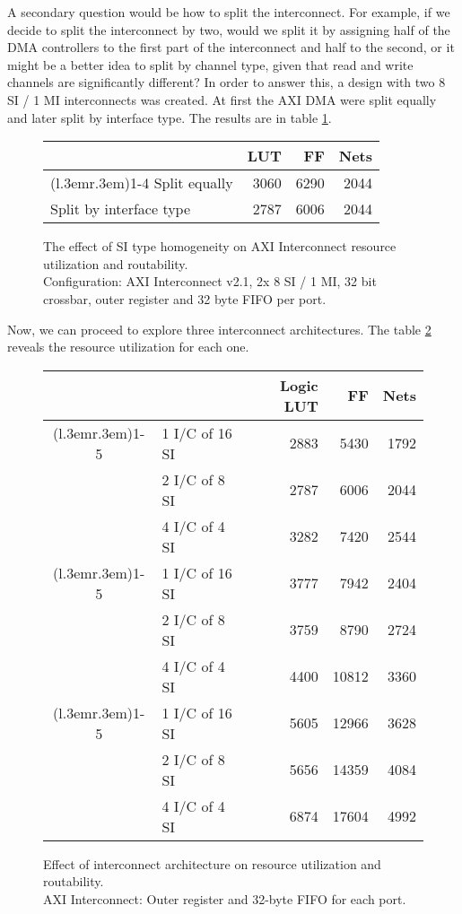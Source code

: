 A secondary question would be how to split the interconnect.
For example, if we decide to split the interconnect by two,
would we split it by assigning half of the DMA controllers to the first
part of the interconnect and half to the second, or it might be a better idea to split by
channel type, given that read and write channels are significantly different?
In order to answer this, a design with two 8 SI / 1 MI interconnects was created.
At first the AXI DMA were split equally and later split by interface type.
The results are in table \ref{tab:int-mixed}.

\begin{figure}[ht!]
\centering
\begin{tabular}{lrrr}
\toprule
			& LUT	& FF	& Nets \\
\cmidrule(l{.3em}r{.3em}){1-4}
Split equally 		& 3060	&6290	&2044 	\\
Split by interface type	& 2787	&6006	& 2044	\\
\bottomrule
\end{tabular}
\caption{The effect of SI type homogeneity on AXI Interconnect resource utilization and routability.\\
	Configuration: AXI Interconnect v2.1, 2x 8 SI / 1 MI, 32 bit crossbar,
	outer register and 32 byte FIFO per port.}
\label{tab:int-mixed}
\end{figure}

Now, we can proceed to explore three interconnect architectures.
The table \ref{tab:int-msi} reveals the resource utilization for each one.

\begin{figure}[ht!]
\centering
\begin{tabular}{cl rrr}
\toprule
&		&Logic LUT & FF	& Nets \\
\cmidrule(l{.3em}r{.3em}){1-5}
\multirow{3}{*}{\rotatebox{90}{32 bit}}
&1 I/C of 16 SI	& 2883	& 5430	& 1792 	\\
&2 I/C of 8 SI	& 2787	& 6006	& 2044	\\
&4 I/C of 4 SI	& 3282	& 7420	& 2544	\\
\cmidrule(l{.3em}r{.3em}){1-5}
\multirow{3}{*}{\rotatebox{90}{64 bit}}
&1 I/C of 16 SI	& 3777	& 7942 	& 2404	\\
&2 I/C of 8 SI	& 3759	& 8790	& 2724	\\
&4 I/C of 4 SI	& 4400	&10812	& 3360	\\
\cmidrule(l{.3em}r{.3em}){1-5}
\multirow{3}{*}{\rotatebox{90}{128 bit}}
&1 I/C of 16 SI	& 5605	& 12966	& 3628	\\
&2 I/C of 8 SI	& 5656	& 14359	& 4084	\\
&4 I/C of 4 SI	& 6874	& 17604	& 4992	\\
\bottomrule
\end{tabular}
\caption{Effect of interconnect architecture on resource utilization and routability.\\
	AXI Interconnect: Outer register and 32-byte FIFO for each port.}
\label{tab:int-msi}
\end{figure}

